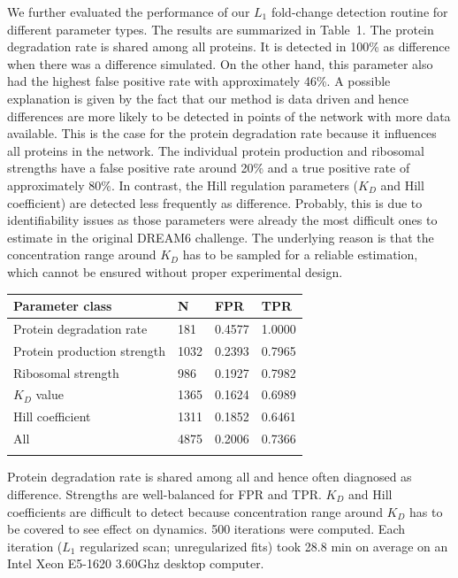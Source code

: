 \documentclass{bioinfo}
\begin{document}
We further evaluated the performance of our $L_1$ fold-change detection routine for different parameter types.
The results are summarized in Table~1\vphantom{\ref{Tab:01}}.
The protein degradation rate is shared among all proteins.
It is detected in 100\% as difference when there was a difference simulated.
On the other hand, this parameter also had the highest false positive rate with approximately 46\%.
A possible explanation is given by the fact that our method is data driven and hence differences are more likely to be detected in points of the network with more data available.
This is the case for the protein degradation rate because it influences all proteins in the network.
The individual protein production and ribosomal strengths have a false positive rate around 20\% and a true positive rate of approximately 80\%.
In contrast, the Hill regulation parameters ($K_D$ and Hill coefficient) are detected less frequently as difference.
Probably, this is due to identifiability issues as those parameters were already the most difficult ones to estimate in the original DREAM6 challenge.
The underlying reason is that the concentration range around $K_D$ has to be sampled for a reliable estimation, which cannot be ensured without proper experimental design.


\begin{table}[!t]
 {\begin{tabular}{@{}llll@{}}\toprule Parameter class &
N & FPR & TPR\\\midrule
Protein degradation rate & 181 & 0.4577 & 1.0000\\
Protein production strength & 1032 & 0.2393 & 0.7965\\
Ribosomal strength & 986 & 0.1927 & 0.7982\\
$K_D$ value & 1365 & 0.1624 & 0.6989\\
Hill coefficient & 1311 & 0.1852 & 0.6461\\\hline
All & 4875 & 0.2006 & 0.7366\\\botrule
\end{tabular}}{Protein degradation rate is shared among all and hence often diagnosed as difference. Strengths are well-balanced for FPR and TPR. $K_D$ and Hill coefficients are difficult to detect because concentration range around $K_D$ has to be covered to see effect on dynamics. 500 iterations were computed. Each iteration ($L_1$ regularized scan; unregularized fits) took 28.8 min on average on an Intel Xeon E5-1620 3.60Ghz desktop computer.}
\end{table}
\end{document}
